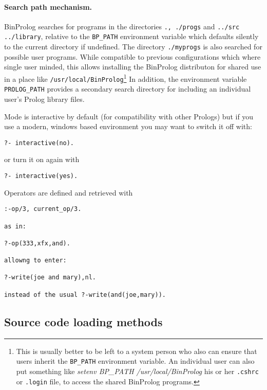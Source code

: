 \documentclass{article}
\begin{document}
\paragraph{Search path mechanism.} BinProlog
searches for programs in the directories {\tt ., ./progs}
 and {\tt ../src ../library}, relative to
the {\tt BP\_PATH} environment variable which defaults
silently to the current directory if undefined.
The directory {\tt ./myprogs} is also searched for possible
user programs. While compatible to previous configurations
which where single user minded, this allows installing the
BinProlog distributon for shared use in a place like 
{\tt /usr/local/BinProlog}\footnote{This is usually better to
be left to a system person who 	also can ensure that users
inherit the {\tt BP\_PATH} environment variable. An individual user
can also put something like {\em setenv BP\_PATH /usr/local/BinProlog}
his or her {\tt .cshrc} or {\tt .login} file, to access the shared
BinProlog programs.} In addition, the environment variable {\tt PROLOG\_PATH}
provides a secondary search directory for including an 
individual user's Prolog library files.

{\flushleft Mode}
is interactive by default (for compatibility with other Prologs) but if
you use a modern, windows based environment you may want to switch it
off with:

\begin{verbatim}
?- interactive(no).
\end{verbatim}

{\flushleft or} turn it on again with

\begin{verbatim}
?- interactive(yes).
\end{verbatim}



{\flushleft Operators} are defined and retrieved with

\begin{verbatim}
:-op/3, current_op/3.

as in:

?-op(333,xfx,and).

allowng to enter:

?-write(joe and mary),nl.

instead of the usual ?-write(and(joe,mary)).
\end{verbatim}

\subsection{Source code loading methods}
\end{document}
